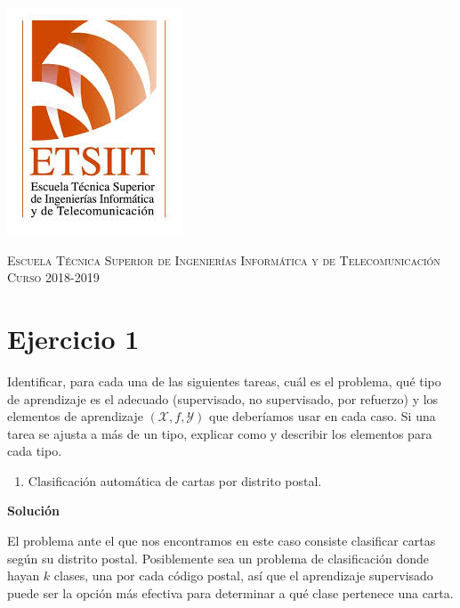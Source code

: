\documentclass[11pt,a4paper]{article}
\newcommand{\answer}{\noindent\textbf{Solución}}
\begin{document}
\begin{titlepage}
\begin{minipage}{\textwidth}
\includegraphics[scale=0.3]{img/etsiit.jpeg}

\vspace{0.7cm}
\textsc{Escuela Técnica Superior de Ingenierías Informática y de Telecomunicación}\\
\vspace{1cm}
\textsc{Curso 2018-2019}
\end{minipage}
\end{titlepage}

\tableofcontents
\thispagestyle{empty}				%

\newpage

\setlength{\parskip}{1em}

\section*{Ejercicio 1}

\noindent Identificar, para cada una de las siguientes tareas, cuál es el problema, qué tipo de aprendizaje es el adecuado
(supervisado, no supervisado, por refuerzo) y los elementos de aprendizaje $(\mathcal{X} , f, \mathcal{Y})$ que deberíamos
usar en cada caso. Si una tarea se ajusta a más de un tipo, explicar como y describir los elementos para cada tipo.

\begin{enumerate}[label=\textit{\alph*})]
	\item Clasificación automática de cartas por distrito postal.
\end{enumerate}

\answer

El problema ante el que nos encontramos en este caso consiste clasificar cartas según su distrito postal. Posiblemente
sea un problema de clasificación donde hayan $k$ clases, una por cada código postal, así que el aprendizaje supervisado puede
ser la opción más efectiva para determinar a qué clase pertenece una carta.
\end{document}

